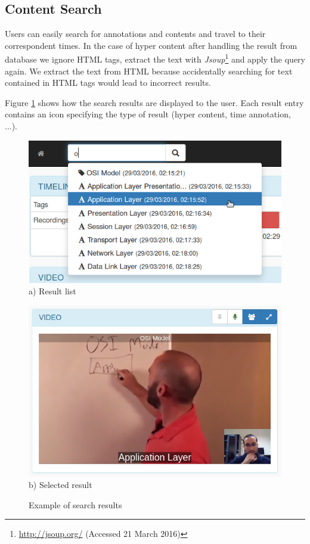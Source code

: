 	\subsection{Content Search}

	Users can easily search for annotations and contents and travel to their correspondent times. In the case of hyper content after handling the result from database we ignore \ac{HTML} tags, extract the text with \emph{Jsoup}\footnote{\url{http://jsoup.org/} (Accessed 21 March 2016)} and apply the query again. We extract the text from \ac{HTML} because accidentally searching for text contained in \ac{HTML} tags would lead to incorrect results.

	Figure \ref{fig:search} shows how the search results are displayed to the user. Each result entry contains an icon specifying the type of result (hyper content, time annotation, ...).




\begin{figure}[!htb]
	\centering
	\begin{minipage}[b]{0.55\linewidth}
		\centering
		\includegraphics[width=\textwidth]{figures/search.png}
		a) Result list
	\end{minipage}
	\quad
	\begin{minipage}[b]{0.40\linewidth}
		\centering
		\includegraphics[width=\textwidth]{figures/search2.png}
	    b) Selected result
	\end{minipage}
	\caption{Example of search results}
	\label{fig:search}
\end{figure}


